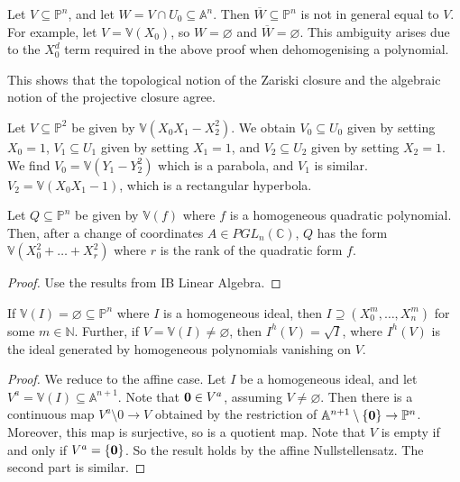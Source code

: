 \begin{remark}
    Let \( V \subseteq \mathbb P^n \), and let \( W = V \cap U_0 \subseteq \mathbb A^n \).
    Then \( \overline W \subseteq \mathbb P^n \) is not in general equal to \( V \).
    For example, let \( V = \mathbb V(X_0) \), so \( W = \varnothing \) and \( \overline W = \varnothing \).
    This ambiguity arises due to the \( X_0^d \) term required in the above proof when dehomogenising a polynomial.
\end{remark}
This shows that the topological notion of the Zariski closure and the algebraic notion of the projective closure agree.
\begin{example}
    Let \( V \subseteq \mathbb P^2 \) be given by \( \mathbb V(X_0 X_1 - X_2^2) \).
    We obtain \( V_0 \subseteq U_0 \) given by setting \( X_0 = 1 \), \( V_1 \subseteq U_1 \) given by setting \( X_1 = 1 \), and \( V_2 \subseteq U_2 \) given by setting \( X_2 = 1 \).
    We find \( V_0 = \mathbb V(Y_1 - Y_2^2) \) which is a parabola, and \( V_1 \) is similar.
    \( V_2 = \mathbb V(X_0 X_1 - 1) \), which is a rectangular hyperbola.
\end{example}
\begin{theorem}
    Let \( Q \subseteq \mathbb P^n \) be given by \( \mathbb V(f) \) where \( f \) is a homogeneous quadratic polynomial.
    Then, after a change of coordinates \( A \in PGL_n(\mathbb C) \), \( Q \) has the form \( \mathbb V(X_0^2 + \dots + X_r^2) \) where \( r \) is the rank of the quadratic form \( f \).
\end{theorem}
\begin{proof}
    Use the results from IB Linear Algebra.
\end{proof}
\begin{theorem}
    If \( \mathbb V(I) = \varnothing \subseteq \mathbb P^n \) where \( I \) is a homogeneous ideal, then \( I \supseteq (X_0^m, \dots, X_n^m) \) for some \( m \in \mathbb N \).
    Further, if \( V = \mathbb V(I) \neq \varnothing \), then \( I^h(V) = \sqrt{I} \), where \( I^h(V) \) is the ideal generated by homogeneous polynomials vanishing on \( V \).
\end{theorem}
\begin{proof}
    We reduce to the affine case.
    Let \( I \) be a homogeneous ideal, and let \( V^a = \mathbb V(I) \subseteq \mathbb A^{n+1} \).
    Note that \( \vb 0 \in V^a \), assuming \( V \neq \varnothing \).
    Then there is a continuous map \( V^a \setminus \qty{0} \to V \) obtained by the restriction of \( \mathbb A^{n+1} \setminus \qty{\vb 0} \to \mathbb P^n \).
    Moreover, this map is surjective, so is a quotient map.
    Note that \( V \) is empty if and only if \( V^a = \qty{\vb 0} \).
    So the result holds by the affine Nullstellensatz.
    The second part is similar.
\end{proof}
